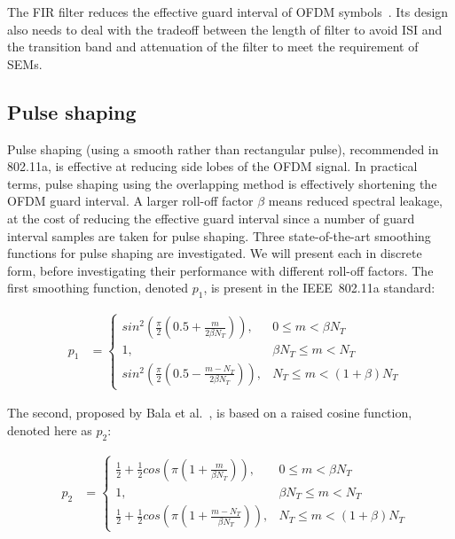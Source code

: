 The FIR filter reduces the effective guard interval of OFDM symbols~\cite{farhang2008signal}.
Its design also needs to deal with the tradeoff between the length of filter to avoid ISI and the transition band and attenuation of the filter to meet the requirement of SEMs.

\subsection{Pulse shaping}
\label{subsec:Pulse}

Pulse shaping (using a smooth rather than rectangular pulse), recommended in 802.11a, is effective at reducing side lobes of the OFDM signal.
In practical terms, pulse shaping using the overlapping method is effectively shortening the OFDM guard interval.
A larger roll-off factor $\beta$ means reduced spectral leakage, at the cost of reducing the effective guard interval since a number of guard interval samples are taken for pulse shaping.
Three state-of-the-art smoothing functions for pulse shaping are investigated. We will present each in discrete form, before investigating their performance with different roll-off factors.
The first smoothing function, denoted $p_1$, is present in the IEEE~802.11a standard:

\begin{eqnarray}
\label{p1m}
&p_1 &=\begin{cases}	sin^2( \frac{\pi}{2}(0.5+\frac{m}{2\beta N_{T}}) ), 			& 0 \leq m < \beta N_{T} \\
					 	1, 															& \beta N_{T} \leq m < N_{T}  \\
					 	sin^2( \frac{\pi}{2}(0.5-\frac{m-N_{T}}{2\beta N_{T}}) ), 	& N_{T} \leq m < (1+\beta)N_{T} \end{cases}
\end{eqnarray}


The second, proposed by Bala et al.~\cite{Bala2013}, is based on a raised cosine function, denoted here as $p_2$:


\begin{eqnarray}
\label{p2m}
&p_2 &=\begin{cases}	\frac{1}{2}+\frac{1}{2}cos(\pi(1+\frac{m}{\beta N_{T}})), 			&0\leq m<\beta N_{T} \\
					 	1, 																	&\beta N_{T}\leq m < N_{T}  \\
					 	\frac{1}{2}+\frac{1}{2}cos(\pi(1+\frac{m-N_{T}}{\beta N_{T}})),		& N_{T}\leq m<(1+\beta)N_{T} \end{cases}
\end{eqnarray}


